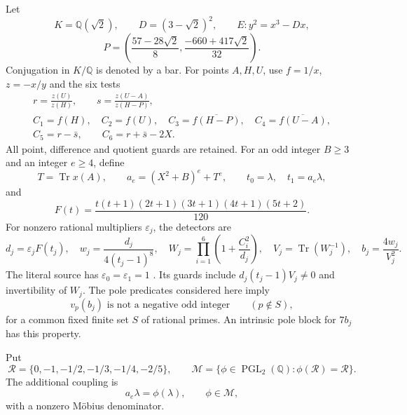 \documentclass[11pt,a4paper]{article}
\newcommand{\Q}{\mathbb Q}\newcommand{\Z}{\mathbb Z}
\DeclareMathOperator{\Tr}{Tr}\DeclareMathOperator{\Gal}{Gal}
\begin{document}
Let
\[
 K=\Q(\sqrt2),\qquad D=(3-\sqrt2)^2,\qquad E:y^2=x^3-Dx,
\]
\[
 P=\left(\frac{57-28\sqrt2}{8},
                    \frac{-660+417\sqrt2}{32}\right).
\]
Conjugation in $K/\Q$ is denoted by a bar. For points $A,H,U$, use
$f=1/x$, $z=-x/y$ and the six tests
\begin{equation}\label{eq:tests}
\begin{gathered}
 r=\frac{z(U)}{z(H)},\qquad s=\frac{z(U-A)}{z(H-P)},\\
 C_1=f(H),\quad C_2=f(U),\quad
 C_3=\overline{f(H-P)},\quad C_4=\overline{f(U-A)},\\
 C_5=r-\bar s,\qquad C_6=r+\bar s-2X.
\end{gathered}
\end{equation}
All point, difference and quotient guards are retained. For an odd
integer $B\ge3$ and an integer $e\ge4$, define
\begin{equation}\label{eq:source}
 T=\Tr x(A),\qquad a_e=(X^2+B)^e+T^e,
 \qquad t_0=\lambda,\quad t_1=a_e\lambda,
\end{equation}
and
\begin{equation}\label{eq:F}
 F(t)=\frac{t(t+1)(2t+1)(3t+1)(4t+1)(5t+2)}{120}.
\end{equation}
For nonzero rational multipliers $\varepsilon_j$, the detectors are
\begin{equation}\label{eq:detector}
 d_j=\varepsilon_jF(t_j),\quad
 w_j=\frac{d_j}{4(t_j-1)^8},\quad
 W_j=\prod_{i=1}^6\left(1+\frac{C_i^2}{d_j}\right),\quad
 V_j=\Tr(W_j^{-1}),\quad b_j=\frac{4w_j}{V_j^2}.
\end{equation}
The literal source has $\varepsilon_0=\varepsilon_1=1$
\cite{Reweighted}. Its guards include
$d_j(t_j-1)V_j\ne0$ and invertibility of $W_j$.
The pole predicates considered here imply
\begin{equation}\label{eq:pole}
 v_p(b_j)\text{ is not a negative odd integer}\qquad(p\notin S),
\end{equation}
for a common fixed finite set $S$ of rational primes. An intrinsic
pole block for $7b_j$ has this property\cite{Intrinsic}.

Put
\[
 \mathcal R=\{0,-1,-1/2,-1/3,-1/4,-2/5\},\qquad
 \mathcal M=\{\phi\in\operatorname{PGL}_2(\Q):\phi(\mathcal R)=\mathcal R\}.
\]
The additional coupling is
\begin{equation}\label{eq:coupling}
                         a_e\lambda=\phi(\lambda),\qquad\phi\in\mathcal M,
\end{equation}
with a nonzero M\"obius denominator.
\end{document}
